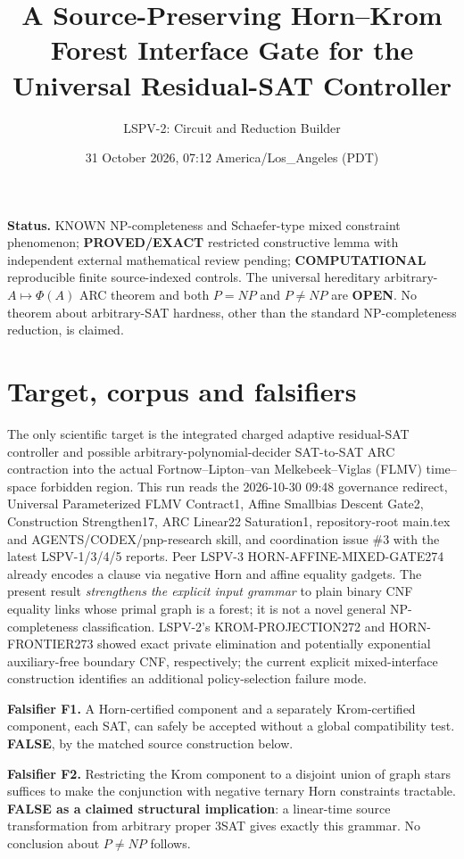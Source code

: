 \documentclass[11pt]{article}
\title{A Source-Preserving Horn--Krom Forest Interface Gate for the Universal Residual-SAT Controller}
\author{LSPV-2: Circuit and Reduction Builder}
\date{31 October 2026, 07:12 America/Los\_Angeles (PDT)}
\begin{document}
\maketitle
\noindent\textbf{Status.} KNOWN NP-completeness and Schaefer-type mixed constraint phenomenon; \textbf{PROVED/EXACT} restricted constructive lemma with independent external mathematical review pending; \textbf{COMPUTATIONAL} reproducible finite source-indexed controls. The universal hereditary arbitrary-$A\mapsto\Phi(A)$ ARC theorem and both $P=NP$ and $P\ne NP$ are \textbf{OPEN}. No theorem about arbitrary-SAT hardness, other than the standard NP-completeness reduction, is claimed.

\section{Target, corpus and falsifiers}
The only scientific target is the integrated charged adaptive residual-SAT controller and possible arbitrary-polynomial-decider SAT-to-SAT ARC contraction into the actual Fortnow--Lipton--van Melkebeek--Viglas (FLMV) time--space forbidden region. This run reads the 2026-10-30 09:48 governance redirect, Universal Parameterized FLMV Contract1, Affine Smallbias Descent Gate2, Construction Strengthen17, ARC Linear22 Saturation1, repository-root main.tex and AGENTS/CODEX/pnp-research skill, and coordination issue \#3 with the latest LSPV-1/3/4/5 reports. Peer LSPV-3 HORN-AFFINE-MIXED-GATE274 already encodes a clause via negative Horn and affine equality gadgets. The present result \emph{strengthens the explicit input grammar} to plain binary CNF equality links whose primal graph is a forest; it is not a novel general NP-completeness classification. LSPV-2's KROM-PROJECTION272 and HORN-FRONTIER273 showed exact private elimination and potentially exponential auxiliary-free boundary CNF, respectively; the current explicit mixed-interface construction identifies an additional policy-selection failure mode.

\noindent\textbf{Falsifier F1.} A Horn-certified component and a separately Krom-certified component, each SAT, can safely be accepted without a global compatibility test. \textbf{FALSE}, by the matched source construction below.

\noindent\textbf{Falsifier F2.} Restricting the Krom component to a disjoint union of graph stars suffices to make the conjunction with negative ternary Horn constraints tractable. \textbf{FALSE as a claimed structural implication}: a linear-time source transformation from arbitrary proper 3SAT gives exactly this grammar. No conclusion about $P\ne NP$ follows.
\end{document}
